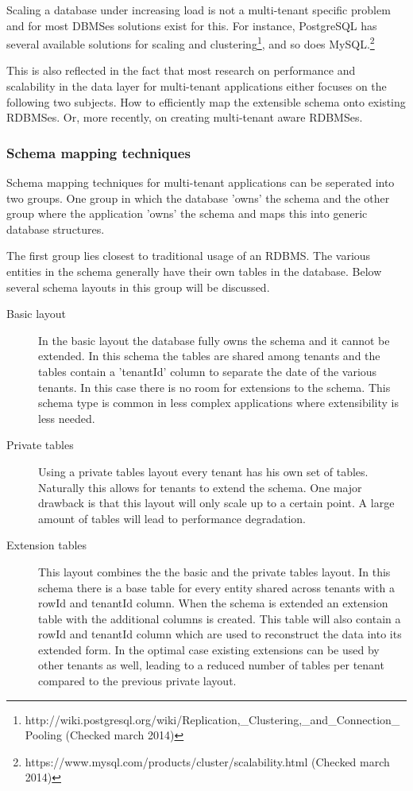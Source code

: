 Scaling a database under increasing load is not a multi-tenant specific problem and for most DBMSes solutions exist for this. 
For instance, PostgreSQL has several available solutions for scaling and clustering\footnote{http://wiki.postgresql.org/wiki/Replication,\_Clustering,\_and\_Connection\_Pooling (Checked march 2014)}, and so does MySQL.\footnote{https://www.mysql.com/products/cluster/scalability.html (Checked march 2014)}

This is also reflected in the fact that most research on performance and scalability in the data layer for multi-tenant applications either focuses on the following two subjects.
How to efficiently map the extensible schema onto existing RDBMSes.\cite{aulbach2008multi, aulbach2009comparison} 
Or, more recently, on creating multi-tenant aware RDBMSes.\cite{schiller2011native, aulbach2011extensibility} 

\subsubsection{Schema mapping techniques}
Schema mapping techniques for multi-tenant applications can be seperated into two groups. 
One group in which the database 'owns' the schema  and the other group where the application 'owns' the schema and maps this into generic database structures.\cite{aulbach2009comparison}

The first group lies closest to traditional usage of an RDBMS. 
The various entities in the schema generally have their own tables in the database.
Below several schema layouts in this group will be discussed.
\begin{description}
	\item[Basic layout] In the basic layout the database fully owns the schema and it cannot be extended. 
		In this schema the tables are shared among tenants and the tables contain a 'tenantId' column to separate the date of the various tenants.
		In this case there is no room for extensions to the schema. 
		This schema type is common in less complex applications where extensibility is less needed. \cite{aulbach2008multi}
	\item[Private tables] Using a private tables layout every tenant has his own set of tables. 
		Naturally this allows for tenants to extend the schema. 
		One major drawback is that this layout will only scale up to a certain point. 
		A large amount of tables will lead to performance degradation.\cite{aulbach2008multi}
	\item[Extension tables]
		This layout combines the the basic and the private tables layout.
		In this schema there is a base table for every entity shared across tenants with a rowId and tenantId column.
		When the schema is extended an extension table with the additional columns is created.
		This table will also contain a rowId and tenantId column which are used to reconstruct the data into its extended form.
		In the optimal case existing extensions can be used by other tenants as well, leading to a reduced number of tables per tenant compared to the previous private layout.\cite{aulbach2008multi}
\end{description}

